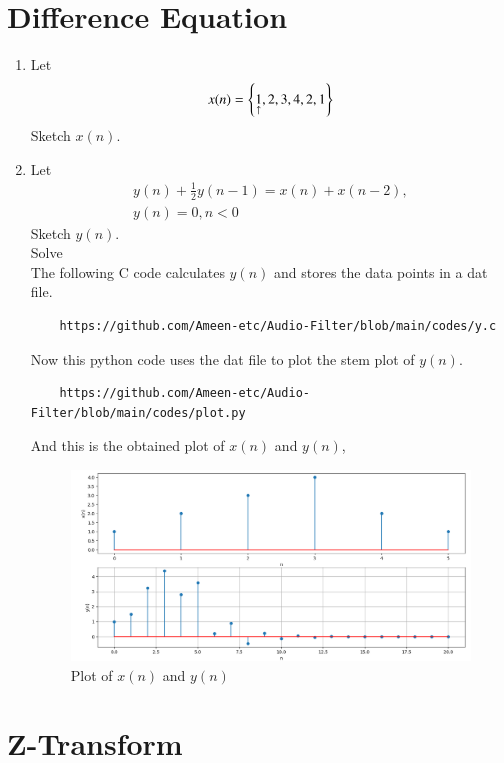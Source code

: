 \documentclass[journal,12pt,twocolumn]{IEEEtran}
\theoremstyle{remark}
\begin{document}
\section{Difference Equation}
\begin{enumerate}[label=\thesection.\arabic*,ref=\thesection.\theenumi]
\item Let
\begin{equation}
x(n) = \left\{\underset{\uparrow}{1},2,3,4,2,1\right\} \label{prob:2.1}
\end{equation}
Sketch $x(n)$. 
\item Let
\begin{multline}
y(n) + \frac{1}{2}y(n-1) = x(n) + x(n-2), 
\\
y(n) = 0, n < 0 \label{prob:2.2}
\end{multline}
Sketch $y(n)$.\\
Solve\\
The following C code calculates $y(n)$ and stores the data points in a dat file.
\begin{lstlisting}
    https://github.com/Ameen-etc/Audio-Filter/blob/main/codes/y.c
\end{lstlisting}
Now this python code uses the dat file to plot the stem plot of $y(n)$.
\begin{lstlisting}
    https://github.com/Ameen-etc/Audio-Filter/blob/main/codes/plot.py
\end{lstlisting}
And this is the obtained plot of $x(n)$ and $y(n)$,
\begin{figure}[h!]
    \centering
    \includegraphics[width=\columnwidth]{figs/x and y.png}
    \caption{Plot of $x(n)$ and $y(n)$}
    \label{fig:x-y}
\end{figure}
\end{enumerate}
\section{Z-Transform}
\end{document}
